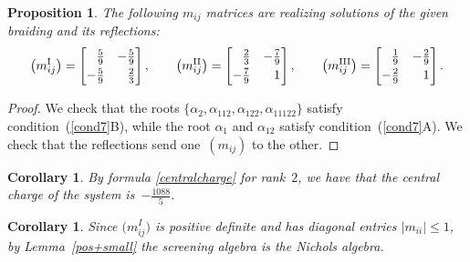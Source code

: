\documentclass[pdftex]{sigma}%
\numberwithin{equation}{section}
\newtheorem{cor}[teo]{Corollary}
\newtheorem{prop}[teo]{Proposition}
\begin{document}
\begin{prop}
The following $m_{ij}$ matrices are realizing solutions of the given braiding and its reflections:
\[\big(m_{ij}^{\mathrm{I}}\big)= \begin{bmatrix}
 \hphantom{-}\frac{5}{9} & -\frac{5}{9}\vspace{1mm}\\
 -\frac{5}{9} & \hphantom{-}\frac{2}{3}
\end{bmatrix}, \qquad
\big(m_{ij}^{\mathrm{II}}\big)= \begin{bmatrix}
\hphantom{-} \frac{2}{3} & -\frac{7}{9}\vspace{1mm}\\
 -\frac{7}{9} & \hphantom{-}1
\end{bmatrix}, \qquad
\big(m_{ij}^{\mathrm{III}}\big)= \begin{bmatrix}
 \hphantom{-}\frac{1}{9} & -\frac{2}{9}\vspace{1mm}\\
 -\frac{2}{9} & \hphantom{-}1
\end{bmatrix}. \]
\end{prop}
\begin{proof}
We check that the roots $\lbrace \alpha_2, \alpha_{112}, \alpha_{122}, \alpha_{11122}\rbrace$ satisfy condition~(\ref{cond7}B), while the root $\alpha_1$ and $\alpha_{12}$ satisfy condition~(\ref{cond7}A).
We check that the reflections send one~$(m_{ij})$ to the other.
\end{proof}
\begin{cor}
By formula \eqref{centralcharge} for rank~$2$, we have that the central charge of the system is~$-\frac{1088}{5}$.
\end{cor}

\begin{cor}Since $\big(m_{ij}^I\big)$ is positive definite and has diagonal entries $|m_{ii}|\leq 1$, by Lemma~{\rm \ref{pos+small}} the screening algebra is the Nichols algebra.
\end{cor}
\end{document}

